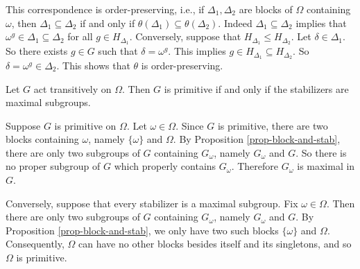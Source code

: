 \begin{remark}
	This correspondence is order-preserving, i.e., if $\Delta_1,\Delta_2$ are blocks of $\Omega$ containing $\omega$, then $\Delta_1\subseteq \Delta_2$ if and only if $\theta(\Delta_1)\subseteq \theta(\Delta_2)$. Indeed $\Delta_1\subseteq \Delta_2$ implies that $\omega^g \in \Delta_1\subseteq \Delta_2$ for all $g\in H_{\Delta_1}$. Conversely, suppose that $H_{\Delta_1}\leq H_{\Delta_2}$. Let $\delta\in \Delta_1$. So there exists $g\in G$ such that $\delta = \omega^g$. This implies $g\in H_{\Delta_1}\subseteq H_{\Delta_2}$. So $\delta = \omega^g \in \Delta_2$. This shows that $\theta$ is order-preserving.
\end{remark}

\begin{corollary}
	Let $G$ act transitively on $\Omega$. Then $G$ is primitive if and only
	if the stabilizers are maximal subgroups.
\end{corollary}
\begin{sketch}
	Suppose $G$ is primitive on $\Omega$. Let $\omega \in \Omega$.  Since $G$ is primitive, there are  two  blocks containing $\omega$, namely $\{\omega\}$ and $\Omega$.  By Proposition \ref{prop-block-and-stab}, there are only two subgroups of $G$ containing $G_\omega$, namely $G_\omega$ and $G$. So there is no proper subgroup of $G$ which properly contains $G_\omega$. Therefore $G_\omega$ is maximal in $G$.
	
	Conversely, suppose that every stabilizer is a maximal subgroup. Fix $\omega\in \Omega$. Then there are only two subgroups of $G$ containing $G_\omega$, namely $G_\omega$ and $G$. By Proposition \ref{prop-block-and-stab}, we only have two such blocks $\{\omega\}$ and $\Omega$.  Consequently, $\Omega$ can have no other blocks besides itself and its singletons, and so $\Omega$ is primitive.
\end{sketch}

